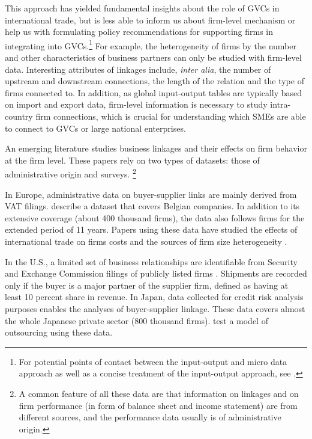 \documentclass[final, dvipsnames, authoryear,12pt]{elsarticle}
\begin{document}
This approach has yielded fundamental insights about the role of GVCs in international trade, but is less able to inform us about firm-level mechanism or help us with formulating policy recommendations for supporting firms in integrating into GVCs.\footnote{For potential points of contact between the input-output and micro data approach as well as a concise treatment of the input-output approach, see \cite{johnson2018measuring}.} For example, the heterogeneity of firms by the number and other characteristics of business partners can only be studied with firm-level data. Interesting attributes of linkages include, \textit{inter alia}, the number of upstream and downstream connections, the length of the relation and the type of firms connected to. In addition, as global input-output tables are typically based on import and export data, firm-level information is necessary to study intra-country firm connections, which is crucial for understanding which SMEs are able to connect to GVCs or large national enterprises.

An emerging literature studies business linkages and their effects on firm behavior at the firm level. These papers rely on two types of datasets: those of administrative origin and surveys. \footnote{A common feature of all these data are that information on linkages and on firm performance (in form of balance sheet and income statement) are from different sources, and the performance data usually is of administrative origin.} 

In Europe, administrative data on buyer-supplier links are mainly derived from VAT filings. \cite{dhyne2015belgian} describe a dataset that covers Belgian companies. In addition to its extensive coverage (about 400 thousand firms), the data also follows firms for the extended period of 11 years. Papers using these data have studied the effects of international trade on firms costs \citep{tintelnot2018trade} and the sources of firm size heterogeneity \citep{bernard2019production}. 

In the U.S., a limited set of business relationships are identifiable from Security and Exchange Commission filings of publicly listed firms \citep{Barrot2016-wc}. Shipments are recorded only if the buyer is a major partner of the supplier firm, defined as having at least 10 percent share in revenue. In Japan, data collected for credit risk analysis purposes enables the analyses of buyer-supplier linkage. These data covers almost the whole Japanese private sector (800 thousand firms). \cite{bernard2019production} test a model of outsourcing using these data. 
\end{document}
